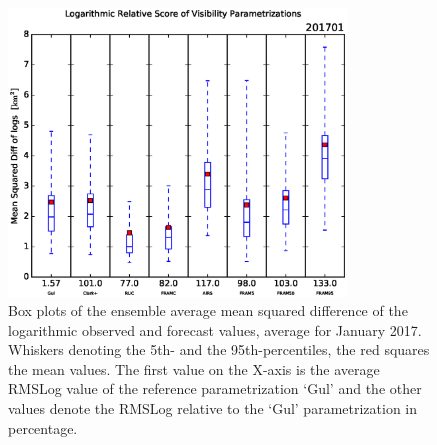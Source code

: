 \begin{figure}[p]
    \centering
    \includegraphics[width=0.8\textwidth]{graphics/results/EnsAv_logRMSE_box-201701.eps}
    \caption[Box Plots of Mean Squared Difference of Logs, January 2017]{Box plots of the ensemble average mean squared difference of the logarithmic observed and forecast values, average for January 2017. Whiskers denoting the 5th- and the 95th-percentiles, the red squares the mean values. The first value on the X-axis is the average RMSLog value of the reference parametrization `Gul' and the other values denote the RMSLog relative to the `Gul' parametrization in percentage.}
    \label{fig:January_logRMSE}
\end{figure}
\FloatBarrier


